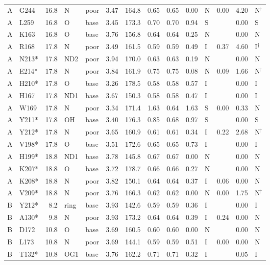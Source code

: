 {\begin{longtable}{llrllrrrrrlrrl}
A & G244 & 16.8 & N & poor & 3.47 & 164.8 & 0.65 & 0.65 & 0.00 & N & 0.00 & 4.20 & N$^\dagger$\\
A & L259 & 16.8 & O & base & 3.45 & 173.3 & 0.70 & 0.70 & 0.94 & S &  & 0.00 & S\\
A & K163 & 16.8 & O & base & 3.76 & 156.8 & 0.64 & 0.64 & 0.25 & N &  & 0.00 & N\\
A & R168 & 17.8 & N & poor & 3.49 & 161.5 & 0.59 & 0.59 & 0.49 & I & 0.37 & 4.60 & I$^\dagger$\\
A & N213* & 17.8 & ND2 & poor & 3.94 & 170.0 & 0.63 & 0.63 & 0.19 & N &  & 0.00 & N\\
A & E214* & 17.8 & N & poor & 3.84 & 161.9 & 0.75 & 0.75 & 0.08 & N & 0.09 & 1.66 & N$^\dagger$\\
A & H210* & 17.8 & O & base & 3.26 & 178.5 & 0.58 & 0.58 & 0.57 & I &  & 0.00 & I\\
A & H167 & 17.8 & ND1 & base & 3.67 & 150.3 & 0.58 & 0.58 & 0.47 & I &  & 0.00 & I\\
A & W169 & 17.8 & N & poor & 3.34 & 171.4 & 1.63 & 0.64 & 1.63 & S & 0.00 & 0.33 & N\\
A & Y211* & 17.8 & OH & base & 3.40 & 176.3 & 0.85 & 0.68 & 0.97 & S &  & 0.00 & S\\
A & Y212* & 17.8 & N & poor & 3.65 & 160.9 & 0.61 & 0.61 & 0.34 & I & 0.22 & 2.68 & N$^\dagger$\\
A & V198* & 17.8 & O & base & 3.51 & 172.6 & 0.65 & 0.65 & 0.73 & I &  & 0.00 & I\\
A & H199* & 18.8 & ND1 & base & 3.78 & 145.8 & 0.67 & 0.67 & 0.00 & N &  & 0.00 & N\\
A & K207* & 18.8 & O & base & 3.72 & 178.7 & 0.66 & 0.66 & 0.27 & N &  & 0.00 & N\\
A & K208* & 18.8 & N & poor & 3.82 & 150.1 & 0.64 & 0.64 & 0.37 & I & 0.06 & 0.00 & N\\
A & V209* & 18.8 & N & poor & 3.76 & 166.3 & 0.62 & 0.62 & 0.00 & N & 0.00 & 1.75 & N$^\dagger$\\
B & Y212* & 8.2 & ring & base & 3.93 & 142.6 & 0.59 & 0.59 & 0.36 & I &  & 0.00 & I\\
B & A130* & 9.8 & N & poor & 3.93 & 173.2 & 0.64 & 0.64 & 0.39 & I & 0.24 & 0.00 & N\\
B & D172 & 10.8 & O & base & 3.69 & 160.5 & 0.60 & 0.60 & 0.00 & N &  & 0.00 & N\\
B & L173 & 10.8 & N & poor & 3.69 & 144.1 & 0.59 & 0.59 & 0.51 & I & 0.00 & 0.00 & N\\
B & T132* & 10.8 & OG1 & base & 3.76 & 162.2 & 0.71 & 0.71 & 0.32 & I &  & 0.05 & I\\

\end{longtable}}
